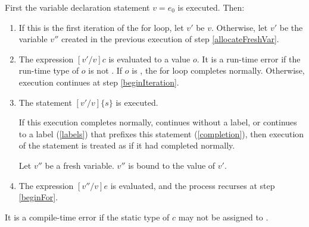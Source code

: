 \documentclass[makeidx]{article}
\begin{document}
{\LMHash{}%
First the variable declaration statement \VAR{} $v = e_0$ is executed.
Then:
\begin{enumerate}
\item
\label{beginFor}
If this is the first iteration of the for loop, let $v'$ be $v$.
Otherwise, let $v'$ be the variable $v''$ created in the previous execution of step \ref{allocateFreshVar}.
\item
The expression $[v'/v]c$ is evaluated to a value $o$.
It is a run-time error if the run-time type of $o$ is not .
If $o$ is \FALSE{}, the for loop completes normally.
Otherwise, execution continues at step \ref{beginIteration}.
\item
\label{beginIteration}
The statement $[v'/v]\{s\}$ is executed.

If this execution completes normally, continues without a label,
or continues to a label (\ref{labels}) that prefixes this \FOR{} statement (\ref{completion}),
then execution of the statement is treated as if it had completed normally.

\label{allocateFreshVar}
Let $v''$ be a fresh variable.
$v''$ is bound to the value of $v'$.
\item
The expression $[v''/v]e$ is evaluated, and the process recurses at step \ref{beginFor}.
\end{enumerate}


\LMHash{}%
It is a compile-time error if the static type of $c$ may not be assigned to .





}
\end{document}
